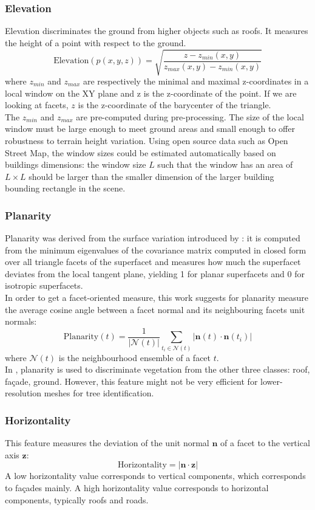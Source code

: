 \documentclass{kththesis}
\begin{document}
\subsubsection{Elevation}
Elevation discriminates the ground from higher objects
such as roofs. It measures the height of a point with respect
to the ground. 
$$\text{Elevation}(p(x,y,z)) = \sqrt{\frac{z - z_{min}(x,y)}{z_{max}(x,y)- z_{min}(x,y)}}$$
where $z_{min}$ and $z_{max}$ are respectively the minimal and maximal z-coordinates in a local window on the XY plane and z is the z-coordinate of the point. If we are looking at facets, $z$ is the z-coordinate of the barycenter of the triangle. \\
The $z_{min}$ and $z_{max}$ are pre-computed during pre-processing. The size of the local window must be large enough to meet ground areas and small enough to offer robustness to terrain height variation. Using open source data such as Open Street Map, the window sizes could be estimated automatically based on buildings dimensions: the window size $L$ such that the window has an area of $L\times L$ should be larger than the smaller dimension of the larger building bounding rectangle in the scene. 

\subsubsection{Planarity}
Planarity was derived from the surface variation introduced by \textcite{Pauly2002}: it is computed from the minimum eigenvalues of the covariance
matrix computed in closed form over all triangle facets of the
superfacet and measures how much the superfacet deviates from the local tangent plane, yielding 1 for planar superfacets and 0 for isotropic superfacets.  \\
In order to get a facet-oriented measure, this work suggests for planarity measure the average cosine angle between a facet normal and its neighbouring facets unit normals:
$$\text{Planarity}(t)= \frac{1}{|\mathcal{N}(t)|} \sum \limits_{t_i \in \mathcal{N}(t)}  |\mathbf{n}(t) \cdot \mathbf{n}(t_i)| $$ where $\mathcal{N}(t)$ is the neighbourhood ensemble of a facet $t$. \\
In \textcite{verdie}, planarity is used to discriminate vegetation from the other three classes: roof, façade, ground. However, this feature might not be very efficient for lower-resolution meshes for tree identification. 

\subsubsection{Horizontality}
This feature measures the deviation of the unit normal $\mathbf{n}$ of a facet to the vertical axis $\mathbf{z}$: 
$$\text{Horizontality}=|\mathbf{n} \cdot \mathbf{z}|$$
A low horizontality value corresponds to vertical components, which corresponds to façades mainly. A high horizontality value corresponds to horizontal components, typically roofs and roads. 
\end{document}
